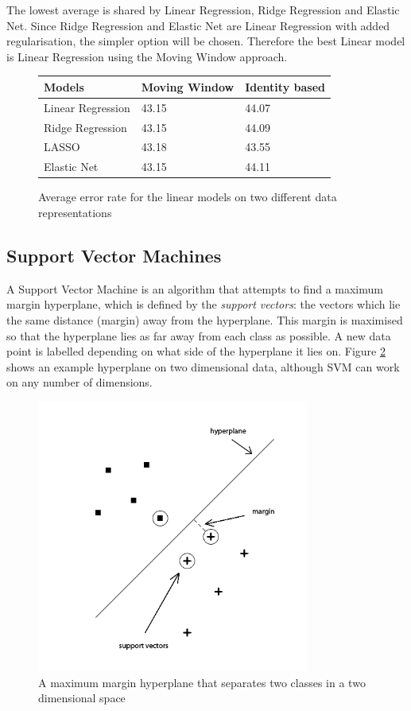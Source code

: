The lowest average is shared by Linear Regression, Ridge Regression and Elastic Net. Since Ridge Regression and Elastic Net are Linear Regression with added regularisation, the simpler option will be chosen. Therefore the best Linear model is Linear Regression using the Moving Window approach.

\begin{figure}[h!]
\centering
\begin{tabular}{l || l | l}
Models & Moving Window & Identity based \\ \hline \hline
Linear Regression & 43.15 & 44.07 \\ \hline
Ridge Regression & 43.15 & 44.09 \\ \hline
LASSO & 43.18 & 43.55 \\ \hline
Elastic Net & 43.15 & 44.11 \\ \hline
\end{tabular}
\caption{Average error rate for the linear models on two different data representations}
\label{table:linearmodelsaverages}
\end{figure}

\subsection{Support Vector Machines}
A Support Vector Machine is an algorithm that attempts to find a maximum margin hyperplane, which is defined by the {\it support vectors}: the vectors which lie the same distance (margin) away from the hyperplane. This margin is maximised so that the hyperplane lies as far away from each class as possible. A new data point is labelled depending on what side of the hyperplane it lies on. Figure \ref{fig:hyperplane} shows an example hyperplane on two dimensional data, although SVM can work on any number of dimensions.

\begin{figure}[h!]
\centering
\includegraphics[width=0.8\textwidth]{images/hyperplane.png}
\caption{A maximum margin hyperplane that separates two classes in a two dimensional space}
\label{fig:hyperplane}
\end{figure}

